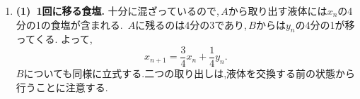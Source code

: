 \begin{enumerate}[label=\textbf{問\arabic*.},leftmargin=3.8em,format=\bookitemlink{practice-bridge}{solution}{problem}]
                \smallskip
                \textbf{(3)~和のを取る.}
                チャートの「総和」に沿って,添字を一つずらした和を引く.\,
                $\displaystyle n\ge1$で,
                \[
                  T_{n-1}=\sum_{k=0}^{n-1}(k+1)(n-k).
                \]
                両方にある項と,\,$\displaystyle T_n$にだけある最後の項を分けると,
                \begin{align*}
                  T_n-T_{n-1}
                    &=\sum_{k=0}^{n-1}(k+1)+(n+1)\\
                    &=\frac{(n+1)(n+2)}2.
                \end{align*}
                この右辺は,連続する三つの整数の積の差
                \[
                  \frac{(n+1)(n+2)(n+3)}6
                    -\frac{n(n+1)(n+2)}6
                \]
                に等しい.したがって,\,$\displaystyle T_0=1$から帰納法で
                \[
                  T_n=\frac{(n+1)(n+2)(n+3)}6
                \]
                を得る.各項の総和を展開する代わりに,求めたい和のを作ったのである.

                \noindent \textbf{【別解】}\\
                玉$\displaystyle n$個と仕切り3本を一列に並べ,仕切りの間にある玉の数を順に$\displaystyle A,B,C,D$の個数とする.
                仕切りが隣り合う場合や端にある場合が,空の箱に対応する.\,
                $\displaystyle n+3$個の位置から仕切りの位置3個を選べばよいので,
                \[
                  T_n=\binom{n+3}{3}
                     =\frac{(n+1)(n+2)(n+3)}6.
                \]
                一つずつ増やす考え方と,一度に全体を数える考え方を比べてみよう.
          \item \textbf{(1)~1回に移る食塩.}
                十分に混ざっているので,\,$\displaystyle A$から取り出す液体には$\displaystyle x_n$の4分の1の食塩が含まれる.\,
                $\displaystyle A$に残るのは4分の3であり,\,$\displaystyle B$からは$\displaystyle y_n$の4分の1が移ってくる.
                よって,
                \[
                  x_{n+1}=\frac34x_n+\frac14y_n.
                \]
                $\displaystyle B$についても同様に立式する.二つの取り出しは,液体を交換する前の状態から行うことに注意する.


\end{enumerate}
